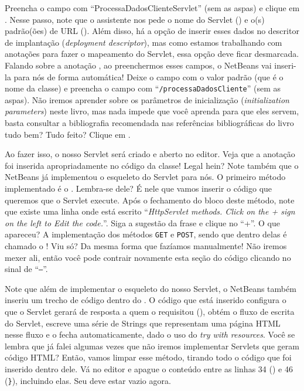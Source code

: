 Preencha o campo  com ``ProcessaDadosClienteServlet'' (sem as aspas) e clique em . Nesse passo, note que o assistente nos pede o nome do Servlet () e o(s) padrão(ões) de URL (). Além disso, há a opção de inserir esses dados no descritor de implantação (\textit{deployment descriptor}), mas como estamos trabalhando com anotações para fazer o mapeamento do Servlet, essa opção deve ficar desmarcada. Falando sobre a anotação , ao preenchermos esses campos, o NetBeans vai inseri-la para nós de forma automática! Deixe o campo  com o valor padrão (que é o nome da classe) e preencha o campo  com ``\texttt{/processaDadosCliente}'' (sem as aspas). Não iremos aprender sobre os parâmetros de inicialização (\textit{initialization parameters}) neste livro, mas nada impede que você aprenda para que eles servem, basta consultar a bibliografia recomendada nas referências bibliográficas do livro tudo bem? Tudo feito? Clique em .

Ao fazer isso, o nosso Servlet será criado e aberto no editor. Veja que a anotação  foi inserida apropriadamente no código da classe! Legal hein? Note também que o NetBeans já implementou o esqueleto do Servlet para nós. O primeiro método implementado é o . Lembra-se dele? É nele que vamos inserir o código que queremos que o Servlet execute. Após o fechamento do bloco deste método, note que existe uma linha onde está escrito ``\textit{HttpServlet methods. Click on the + sign on the left to Edit the code.}''. Siga a sugestão da frase e clique no ``+''. O que apareceu? A implementação dos métodos \texttt{GET} e \texttt{POST}, sendo que dentro delas é chamado o ! Viu só? Da mesma forma que fazíamos manualmente! Não iremos mexer ali, então você pode contrair novamente esta seção do código clicando no sinal de ``\texttt{–}''.

Note que além de implementar o esqueleto do nosso Servlet, o NetBeans também inseriu um trecho de código dentro do . O código que está inserido configura o que o Servlet gerará de resposta a quem o requisitou \linebreak(), obtém o fluxo de escrita do Servlet, escreve uma série de Strings que representam uma página HTML nesse fluxo e o fecha automaticamente, dado o uso do \textit{try with resources}. Você se lembra que já falei algumas vezes que não iremos implementar Servlets que geram código HTML? Então, vamos limpar esse método, tirando todo o código que foi inserido dentro dele. Vá no editor e apague o conteúdo entre as linhas 34 () e 46 (\texttt{\}}), incluindo elas. Seu  deve estar vazio agora.

